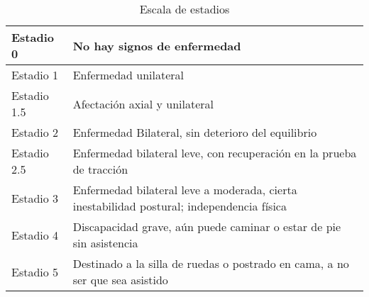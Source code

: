 \begin{table}[H]
\begin{center}
\begin{tabular}{|p{2cm}|p{11cm}|}
\hline
Estadio 0 & No hay signos de enfermedad \\\hline
Estadio 1 & Enfermedad unilateral \\\hline
Estadio 1.5 & Afectación axial y unilateral \\\hline
Estadio 2 & Enfermedad Bilateral, sin deterioro del equilibrio\\\hline
Estadio 2.5 & Enfermedad bilateral leve, con recuperación en la prueba de tracción \\\hline
Estadio 3 & Enfermedad bilateral leve a moderada, cierta inestabilidad postural; independencia física \\\hline
Estadio 4 & Discapacidad grave, aún puede caminar o estar de pie sin asistencia\\\hline
Estadio 5 & Destinado a la silla de ruedas o postrado en cama, a no ser que sea asistido\\\hline
\end{tabular}
\caption{Escala de estadios}
\end{center}
\end{table}


